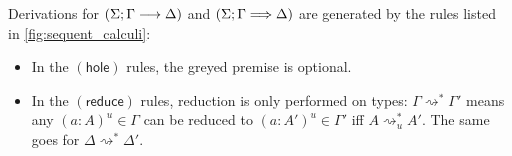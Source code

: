 \documentclass[twoside]{report}
\begin{document}
\begin{definition}
\label{def:typing_calculus}
Derivations for $(\Sigma; \Gamma \longrightarrow \Delta)$ and $(\Sigma; \Gamma \Longrightarrow \Delta)$ are generated by the rules listed in \cref{fig:sequent_calculi}:
\begin{itemize}
    \item In the $(\mathsf{hole})$ rules, the greyed premise is optional.

    \item In the $(\mathsf{reduce})$ rules, reduction is only performed on types: $\Gamma \rightsquigarrow^\ast \Gamma'$ means any $(a : A)^u \in \Gamma$ can be reduced to $(a : A')^u \in \Gamma'$ iff $A \rightsquigarrow^\ast_u A'$. The same goes for $\Delta \rightsquigarrow^\ast \Delta'$.
\end{itemize}
\end{definition}
\end{document}
